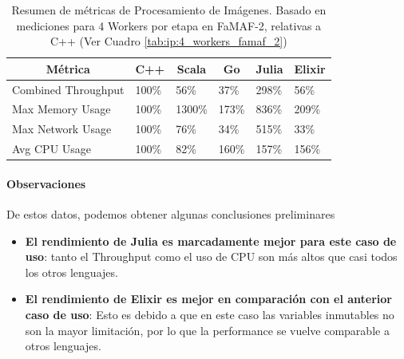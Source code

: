 \documentclass[11pt]{article}
\begin{document}
\begin{table}[h]
\centering
\begin{tabular}{|l|l|l|l|l|l|}
\hline
\multicolumn{1}{|c|}{Métrica} & \multicolumn{1}{c|}{C++} & \multicolumn{1}{c|}{Scala} & \multicolumn{1}{c|}{Go} & \multicolumn{1}{c|}{Julia} & \multicolumn{1}{c|}{Elixir} \\ \hline
Combined Throughput           & 100\%                    & 56\%                       & 37\%                    & 298\%                      & 56\%                        \\ \hline
Max Memory Usage              & 100\%                    & 1300\%                     & 173\%                   & 836\%                      & 209\%                       \\ \hline
Max Network Usage             & 100\%                    & 76\%                       & 34\%                    & 515\%                      & 33\%                        \\ \hline
Avg CPU Usage                 & 100\%                    & 82\%                       & 160\%                   & 157\%                      & 156\%                       \\ \hline
\end{tabular}
\caption{Resumen de métricas de Procesamiento de Imágenes. Basado en mediciones para 4 Workers por etapa en FaMAF-2, relativas a C++ (Ver Cuadro \ref{tab:ip:4_workers_famaf_2})}
\label{tab:sis_dist:ip_metrics}
\end{table}

\paragraph{Observaciones}

De estos datos, podemos obtener algunas conclusiones preliminares

\begin{itemize}
    \item \textbf{El rendimiento de Julia es marcadamente mejor para este caso de uso}: tanto el Throughput como el uso de CPU son más altos que casi todos los otros lenguajes.
    \item \textbf{El rendimiento de Elixir es mejor en comparación con el anterior caso de uso}: Esto es debido a que en este caso las variables inmutables no son la mayor limitación, por lo que la performance se vuelve comparable a otros lenguajes.
\end{itemize}
\end{document}
